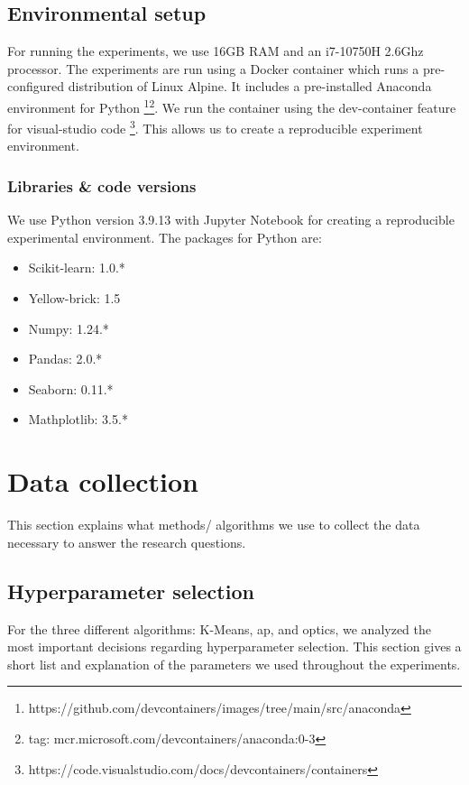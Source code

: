 \subsection{Environmental setup}
For running the experiments, we use 16GB RAM and an i7-10750H 2.6Ghz processor.
The experiments are run using a Docker container which runs a pre-configured distribution of Linux Alpine.
It includes a pre-installed Anaconda environment for Python \footnote{https://github.com/devcontainers/images/tree/main/src/anaconda}\footnote{tag: mcr.microsoft.com/devcontainers/anaconda:0-3}.
We run the container using the dev-container feature for visual-studio code \footnote{https://code.visualstudio.com/docs/devcontainers/containers}.
This allows us to create a reproducible experiment environment.
\subsubsection{Libraries \& code versions}
We use Python version 3.9.13 with Jupyter Notebook for creating a reproducible experimental environment.
The packages for Python are:
\begin{itemize}
    \item Scikit-learn: 1.0.*
    \item Yellow-brick: 1.5
    \item Numpy: 1.24.*
    \item Pandas: 2.0.*
    \item Seaborn: 0.11.*
    \item Mathplotlib: 3.5.*
\end{itemize}

\section{Data collection}
This section explains what methods/ algorithms we use to collect the data necessary to answer the research questions.
\subsection{Hyperparameter selection}
For the three different algorithms: K-Means, \gls{ap}, and \gls{optics}, we analyzed the most important decisions regarding hyperparameter selection.
This section gives a short list and explanation of the parameters we used throughout the experiments.
